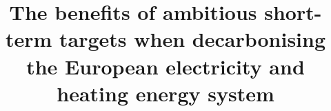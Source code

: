 \documentclass[5p]{elsarticle} %
\begin{document}
\begin{frontmatter}

\title{The benefits of ambitious short-term targets when decarbonising the European electricity and heating energy system}




\begin{abstract}



\end{abstract}

\begin{keyword}


\end{keyword}

\end{frontmatter}

\end{document}
